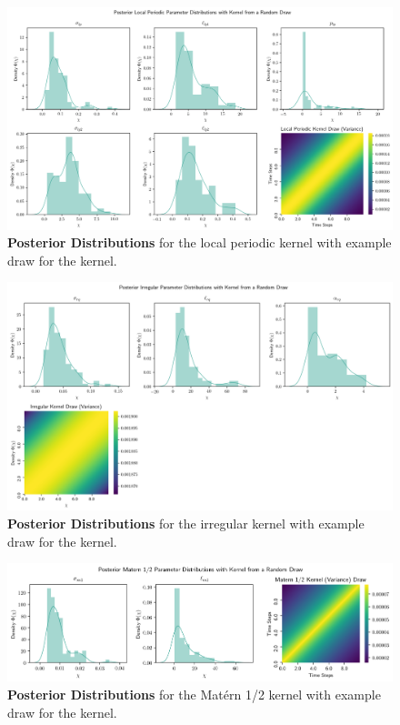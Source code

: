 \documentclass[11pt]{scrartcl}
\begin{document}
\begin{figure}[!hbt]
	\center
	\includegraphics[width=1.2\textwidth,center]{img/gp/gp_kernel_posterior_local_periodic_zoomed.png}
	\caption{\textcolor{viridis5}{\textbf{Posterior Distributions}} for the local periodic kernel with example draw for the kernel.}
	\label{fig:gp_kernel_posterior_local_periodic}
\end{figure}

\begin{figure}[!hbt]
	\center
	\includegraphics[width=1.2\textwidth,center]{img/gp/gp_kernel_posterior_irregular_zoomed.png}
	\caption{\textcolor{viridis5}{\textbf{Posterior Distributions}} for the irregular kernel with example draw for the kernel.}
	\label{fig:gp_kernel_posterior_irregular}
\end{figure}

\begin{figure}[!hbt]
	\center
	\includegraphics[width=1.2\textwidth,center]{img/gp/gp_kernel_posterior_matern1_zoomed.png}
	\caption{\textcolor{viridis5}{\textbf{Posterior Distributions}} for the Matérn 1/2 kernel with example draw for the kernel.}
	\label{fig:gp_kernel_posterior_matern1}
\end{figure}
\end{document}
